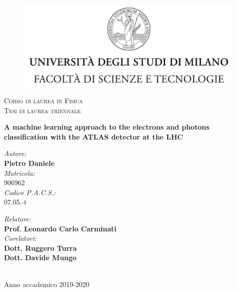 \documentclass[a4paper, oneside]{book}
\begin{document}
	\begin{titlepage}
		\begin{figure}
			\includegraphics[width=\linewidth]{tesi_images/logo.jpg}
		\end{figure}
		\center
		\textsc{\large Corso di laurea in Fisica}\\[0.2cm]
		\textsc{\normalsize Tesi di laurea triennale}\\[2cm]
		
		\begin{doublespace}
			\textbf{\LARGE A machine learning approach to the electrons and photons classification with the ATLAS detector at the LHC}
			\\[2cm]
		\end{doublespace}
		
		\begin{minipage}{0.4\textwidth}
			\begin{flushleft}
				\emph{Autore:} \\[0mm]
				\textbf{Pietro Daniele} \\[4mm]
				\emph{Matricola:}\\
				906962 \\[4mm]
				\emph{Codice P.A.C.S.:}\\[0mm]
				07.05.-t
			\end{flushleft}
		\end{minipage}
		\begin{minipage}{0.4\textwidth}
			\begin{flushright} 
				\emph{Relatore:} \\
				\textbf{Prof. Leonardo Carlo Carminati} \\[1.2em]
				\emph{Corelatori:} \\
				\textbf{Dott. Ruggero Turra} \\
				\textbf{Dott. Davide Mungo} \\[1.2em]
			\end{flushright}
		\end{minipage}\\[2cm]
		\vfill
		Anno accademico 2019-2020
		
	\end{titlepage}
\end{document}
